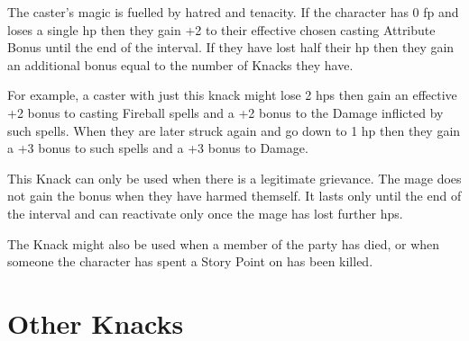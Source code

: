 \begin{multicols}{2}
The caster's magic is fuelled by hatred and tenacity.
If the character has 0 \gls{fp} and loses a single \gls{hp} then they gain +2 to their effective chosen casting Attribute Bonus until the end of the interval.
If they have lost half their \gls{hp} then they gain an additional bonus equal to the number of Knacks they have.

For example, a caster with just this knack might lose 2 \glspl{hp} then gain an effective +2 bonus to casting Fireball spells and a +2 bonus to the Damage inflicted by such spells.
When they are later struck again and go down to 1 \gls{hp} then they gain a +3 bonus to such spells and a +3 bonus to Damage.

This Knack can only be used when there is a legitimate grievance.
The mage does not gain the bonus when they have harmed themself.
It lasts only until the end of the interval and can reactivate only once the mage has lost further \glspl{hp}.

The Knack might also be used when a member of the party has died, or when someone the character has spent a Story Point on has been killed.%


\end{multicols}

\section{Other Knacks}

